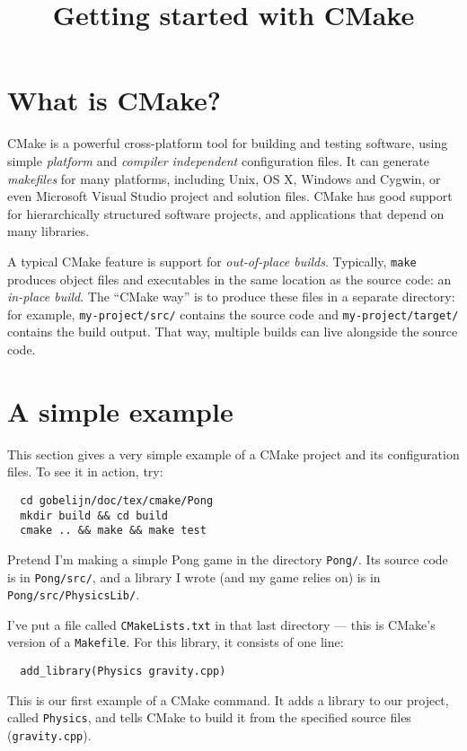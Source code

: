 \documentclass[12pt,a4paper]{article}
\title{Getting started with CMake}
\newcommand{\cod}[1]{{\color{red!60!black}\texttt{#1}}}
\begin{document}
  \date{}
  \maketitle
  \vspace{-2cm}
  \section{What is CMake?}
  CMake is a powerful cross-platform tool for building and testing software, 
  using simple \textit{platform} and \textit{compiler independent} 
  configuration files. It can generate \textit{makefiles} for many platforms, 
  including Unix, OS X, Windows and Cygwin, or even Microsoft Visual Studio 
  project and solution files. CMake has good support for hierarchically 
  structured software projects, and applications that depend on many libraries.
  
  A typical CMake feature is support for \textit{out-of-place builds}.
  Typically, \cod{make} produces object files and executables in the same  
  location as the source code: an \textit{in-place build}. The ``CMake way'' is 
  to produce these files in a separate directory: for example, 
  \cod{my-project/src/} contains the source code and 
  \cod{my-project/target/} contains the build output. That way, multiple 
  builds can live alongside the source code.
  
  \section{A simple example}
  This section gives a very simple example of a CMake project and its
  configuration files. To see it in action, try:
  
  \begin{lstlisting}
  cd gobelijn/doc/tex/cmake/Pong
  mkdir build && cd build
  cmake .. && make && make test
  \end{lstlisting}
  
  Pretend I'm making a simple Pong game in the directory \cod{Pong/}. Its 
  source 
  code is in \cod{Pong/src/}, and a library I wrote (and my game relies on)
  is in \cod{Pong/src/PhysicsLib/}.
  
  I've put a file called 
  \cod{CMakeLists.txt} in that last directory --- this is CMake's version of 
  a \cod{Makefile}. For this library, it consists of one line:
  \begin{lstlisting}
  add_library(Physics gravity.cpp)
  \end{lstlisting}
  This is our first example of a CMake command. It adds a library to our 
  project, called \cod{Physics}, and tells CMake to build it from the 
  specified source files (\cod{gravity.cpp}).
  
\end{document}
